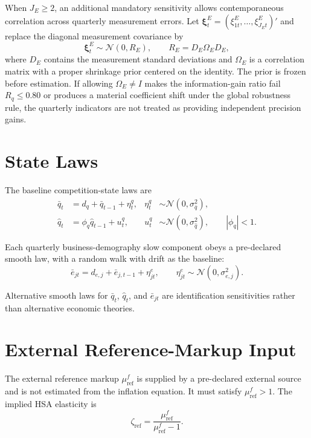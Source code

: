 \documentclass[11pt]{article}
\newcommand{\Normal}{\mathcal{N}}
\begin{document}
When $J_E\ge2$, an additional mandatory sensitivity allows contemporaneous correlation across quarterly measurement errors. Let $\bm\xi_t^E=(\xi_{1t}^E,\ldots,\xi_{J_Et}^E)'$ and replace the diagonal measurement covariance by
\begin{equation}
\bm\xi_t^E\sim\Normal(0,R_E),
\qquad
R_E=D_E\Omega_ED_E,
\end{equation}
where $D_E$ contains the measurement standard deviations and $\Omega_E$ is a correlation matrix with a proper shrinkage prior centered on the identity. The prior is frozen before estimation. If allowing $\Omega_E\neq I$ makes the information-gain ratio fail $R_q\le0.80$ or produces a material coefficient shift under the global robustness rule, the quarterly indicators are not treated as providing independent precision gains.

\section{State Laws}

The baseline competition-state laws are
\begin{align}
\bar q_t
&=
d_q+\bar q_{t-1}+\eta_t^q,
&
\eta_t^q
&\sim\Normal(0,\sigma_{\bar q}^2),
\\
\hat q_t
&=
\phi_q\hat q_{t-1}+u_t^q,
&u_t^q
&\sim\Normal(0,\sigma_{\hat q}^2),
\qquad |\phi_q|<1.
\end{align}

Each quarterly business-demography slow component obeys a pre-declared smooth law, with a random walk with drift as the baseline:
\begin{equation}
\bar e_{jt}
=
d_{e,j}+\bar e_{j,t-1}+\eta_{jt}^{e},
\qquad
\eta_{jt}^{e}\sim\Normal(0,\sigma_{e,j}^2).
\end{equation}

Alternative smooth laws for \(\bar q_t\), \(\hat q_t\), and \(\bar e_{jt}\) are identification sensitivities rather than alternative economic theories.

\section{External Reference-Markup Input}

The external reference markup $\mu_{\mathrm{ref}}^f$ is supplied by a pre-declared external source and is not estimated from the inflation equation. It must satisfy $\mu_{\mathrm{ref}}^f>1$. The implied HSA elasticity is
\begin{equation}
\boxed{
\zeta_{\mathrm{ref}}
=
\frac{\mu_{\mathrm{ref}}^f}{\mu_{\mathrm{ref}}^f-1}.
}
\label{eq:zeta_reference}
\end{equation}
\end{document}
